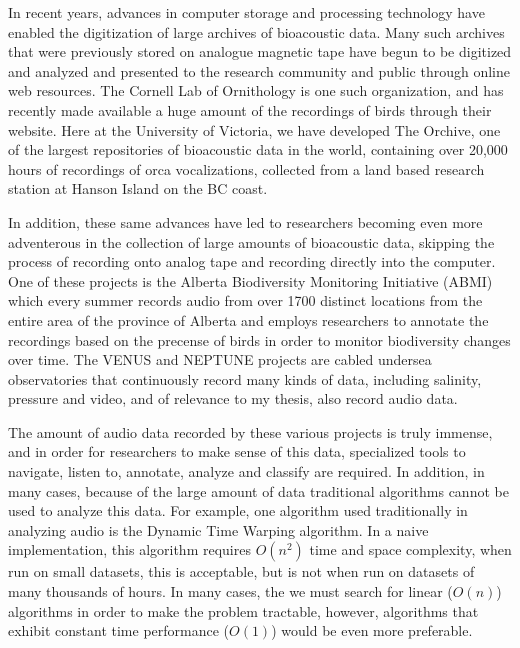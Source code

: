 
\label{chapter:introduction}

In recent years, advances in computer storage and processing
technology have enabled the digitization of large archives of
bioacoustic data.  Many such archives that were previously stored on
analogue magnetic tape have begun to be digitized and analyzed and
presented to the research community and public through online web
resources.  The Cornell Lab of Ornithology is one such organization,
and has recently made available a huge amount of the recordings of
birds through their website.  Here at the University of Victoria, we
have developed The Orchive, one of the largest repositories of
bioacoustic data in the world, containing over 20,000 hours of
recordings of orca vocalizations, collected from a land based research
station at Hanson Island on the BC coast.

In addition, these same advances have led to researchers becoming even
more adventerous in the collection of large amounts of bioacoustic
data, skipping the process of recording onto analog tape and recording
directly into the computer.  One of these projects is the Alberta
Biodiversity Monitoring Initiative (ABMI) which every summer records
audio from over 1700 distinct locations from the entire area of the
province of Alberta and employs researchers to annotate the recordings
based on the precense of birds in order to monitor biodiversity
changes over time.  The VENUS and NEPTUNE projects are cabled undersea
observatories that continuously record many kinds of data, including
salinity, pressure and video, and of relevance to my thesis, also
record audio data.

The amount of audio data recorded by these various projects is truly
immense, and in order for researchers to make sense of this data,
specialized tools to navigate, listen to, annotate, analyze and
classify are required.  In addition, in many cases, because of the
large amount of data traditional algorithms cannot be used to analyze
this data.  For example, one algorithm used traditionally in analyzing
audio is the Dynamic Time Warping algorithm.  In a naive
implementation, this algorithm requires $O(n^2)$ time and space
complexity, when run on small datasets, this is acceptable, but is not
when run on datasets of many thousands of hours.  In many cases, the
we must search for linear ($O(n)$) algorithms in order to make the
problem tractable, however, algorithms that exhibit constant time
performance ($O(1)$) would be even more preferable.

